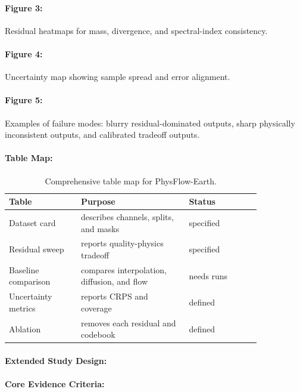\documentclass{article}
\begin{document}
\paragraph{Figure 3:}
Residual heatmaps for mass, divergence, and spectral-index consistency.

\paragraph{Figure 4:}
Uncertainty map showing sample spread and error alignment.

\paragraph{Figure 5:}
Examples of failure modes: blurry residual-dominated outputs, sharp physically inconsistent outputs, and calibrated tradeoff outputs.

\paragraph{Table Map:}

\begin{table}[t]
\centering
\caption{Comprehensive table map for PhysFlow-Earth.}
\begin{tabular}{@{}p{0.24\linewidth}p{0.36\linewidth}p{0.24\linewidth}@{}}
\toprule
\textbf{Table} & \textbf{Purpose} & \textbf{Status}\\
\midrule
Dataset card & describes channels, splits, and masks & specified\\
Residual sweep & reports quality-physics tradeoff & specified\\
Baseline comparison & compares interpolation, diffusion, and flow & needs runs\\
Uncertainty metrics & reports CRPS and coverage & defined\\
Ablation & removes each residual and codebook & defined\\
\bottomrule
\end{tabular}
\end{table}

\paragraph{Extended Study Design:}

\paragraph{Core Evidence Criteria:}
\end{document}
